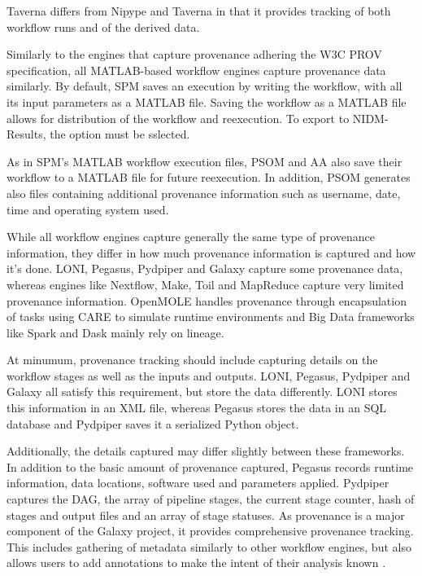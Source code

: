             Taverna differs from Nipype and Taverna in that it provides tracking
            of both workflow runs and of the derived data.

            Similarly to the engines that capture provenance adhering the W3C
            PROV specification, all MATLAB-based workflow engines capture
            provenance data similarly. By default, SPM saves an execution by
            writing the  workflow, with all its input parameters as a MATLAB
            file. Saving the workflow as a MATLAB file allows for distribution
            of the workflow and reexecution. To export to NIDM-Results, the
            option must be sslected.
            
            As in SPM's MATLAB workflow execution files, PSOM and AA also save
            their workflow to a MATLAB file for future reexecution. In addition,
            PSOM generates also files containing additional provenance
            information such as username, date, time and operating system used.
            
            While all workflow engines capture generally the same type of
            provenance information, they differ in how much provenance
            information is captured and how it's done. LONI, Pegasus, Pydpiper
            and Galaxy capture some provenance data, whereas engines like
            Nextflow, Make, Toil and MapReduce capture very limited  
            provenance information. OpenMOLE handles provenance through
            encapsulation of tasks using CARE to simulate runtime environments
            and Big Data frameworks like Spark and Dask mainly rely on lineage.

            At minumum, provenance tracking should include capturing details on
            the workflow stages as well as the inputs and outputs. LONI,
            Pegasus, Pydpiper and Galaxy all satisfy this requirement, but store
            the data differently. LONI stores this information in an XML file,
            whereas Pegasus stores the data in an SQL database and Pydpiper
            saves it a serialized Python object.

            Additionally, the details captured may differ slightly between these
            frameworks. In addition to the basic amount of  provenance captured,
            Pegasus records runtime information, data locations, software used
            and parameters applied. Pydpiper captures the DAG, the array of
            pipeline stages, the current stage counter, hash of stages and
            output files and an array of stage statuses. As provenance is a
            major component of the Galaxy project, it provides comprehensive
            provenance tracking. This includes gathering of metadata similarly
            to other workflow engines, but also allows users to add annotations
            to make the intent of their analysis known .

